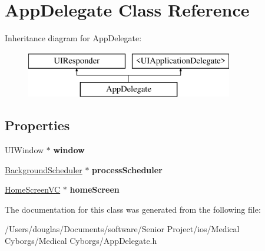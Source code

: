 \hypertarget{interface_app_delegate}{\section{App\-Delegate Class Reference}
\label{interface_app_delegate}
}
Inheritance diagram for App\-Delegate\-:\begin{figure}[H]
\begin{center}
\leavevmode
\includegraphics[height=2.000000cm]{interface_app_delegate}
\end{center}
\end{figure}
\subsection*{Properties}
\begin{DoxyCompactItemize}
\item 
\hypertarget{interface_app_delegate_acf48ac24125e688cac1a85445cd7fac2}{U\-I\-Window $\ast$ {\bfseries window}}\label{interface_app_delegate_acf48ac24125e688cac1a85445cd7fac2}

\item 
\hypertarget{interface_app_delegate_a7774bb6fd8b636a6d6b15f91f2809a91}{\hyperlink{interface_background_scheduler}{Background\-Scheduler} $\ast$ {\bfseries process\-Scheduler}}\label{interface_app_delegate_a7774bb6fd8b636a6d6b15f91f2809a91}

\item 
\hypertarget{interface_app_delegate_a22a5a481802e14bae7bd6cbffd141c65}{\hyperlink{interface_home_screen_v_c}{Home\-Screen\-V\-C} $\ast$ {\bfseries home\-Screen}}\label{interface_app_delegate_a22a5a481802e14bae7bd6cbffd141c65}

\end{DoxyCompactItemize}


The documentation for this class was generated from the following file\-:\begin{DoxyCompactItemize}
\item 
/\-Users/douglas/\-Documents/software/\-Senior Project/ios/\-Medical Cyborgs/\-Medical Cyborgs/App\-Delegate.\-h\end{DoxyCompactItemize}
